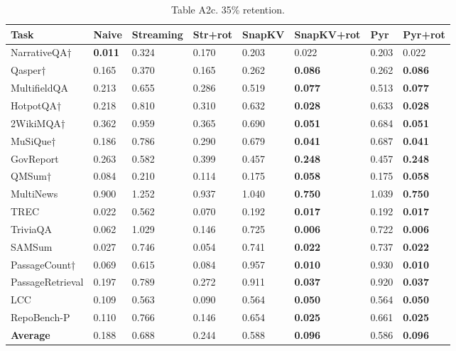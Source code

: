 \documentclass[10pt,letterpaper]{article}
\begin{document}
\begin{table}[H]
\centering
\small
\caption*{Table A2c. 35\% retention.}
\begin{tabular}{@{}llllllll@{}}
\toprule
Task & Naive & Streaming & Str+rot & SnapKV & SnapKV+rot & Pyr &
Pyr+rot\\
\midrule
    NarrativeQA† & \textbf{0.011} & 0.324 & 0.170 & 0.203 & 0.022 & 0.203 & 0.022\\
    Qasper† & 0.165 & 0.370 & 0.165 & 0.262 & \textbf{0.086} & 0.262 & \textbf{0.086}\\
    MultifieldQA & 0.213 & 0.655 & 0.286 & 0.519 & \textbf{0.077} & 0.513 & \textbf{0.077}\\
    HotpotQA† & 0.218 & 0.810 & 0.310 & 0.632 & \textbf{0.028} & 0.633 & \textbf{0.028}\\
    2WikiMQA† & 0.362 & 0.959 & 0.365 & 0.690 & \textbf{0.051} & 0.684 & \textbf{0.051}\\
    MuSiQue† & 0.186 & 0.786 & 0.290 & 0.679 & \textbf{0.041} & 0.687 & \textbf{0.041}\\
    GovReport & 0.263 & 0.582 & 0.399 & 0.457 & \textbf{0.248} & 0.457 & \textbf{0.248}\\
    QMSum† & 0.084 & 0.210 & 0.114 & 0.175 & \textbf{0.058} & 0.175 & \textbf{0.058}\\
    MultiNews & 0.900 & 1.252 & 0.937 & 1.040 & \textbf{0.750} & 1.039 & \textbf{0.750}\\
    TREC & 0.022 & 0.562 & 0.070 & 0.192 & \textbf{0.017} & 0.192 & \textbf{0.017}\\
    TriviaQA & 0.062 & 1.029 & 0.146 & 0.725 & \textbf{0.006} & 0.722 & \textbf{0.006}\\
    SAMSum & 0.027 & 0.746 & 0.054 & 0.741 & \textbf{0.022} & 0.737 & \textbf{0.022}\\
    PassageCount† & 0.069 & 0.615 & 0.084 & 0.957 & \textbf{0.010} & 0.930 & \textbf{0.010}\\
    PassageRetrieval & 0.197 & 0.789 & 0.272 & 0.911 & \textbf{0.037} & 0.920 & \textbf{0.037}\\
    LCC & 0.109 & 0.563 & 0.090 & 0.564 & \textbf{0.050} & 0.564 & \textbf{0.050}\\
    RepoBench-P & 0.110 & 0.766 & 0.146 & 0.654 & \textbf{0.025} & 0.661 & \textbf{0.025}\\
    \textbf{Average}  &  0.188  &  0.688 &  0.244  &  0.588  &  \textbf{0.096}  &  0.586  &  \textbf{0.096}\\
\bottomrule
\end{tabular}
\end{table}
\end{document}
